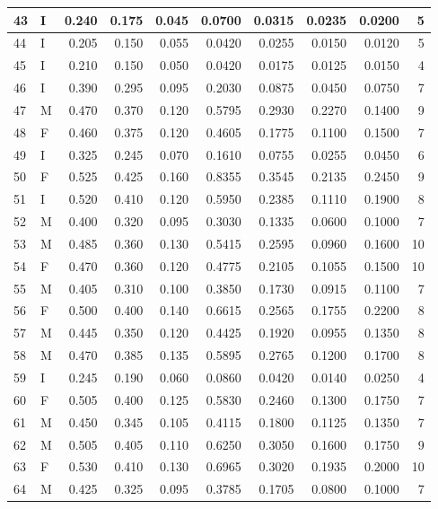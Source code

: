 \documentclass[9pt,twocolumn,twoside,]{pnas-new}
\begin{document}
\begin{tabular}{l|l|r|r|r|r|r|r|r|r}
\hline
43 & I & 0.240 & 0.175 & 0.045 & 0.0700 & 0.0315 & 0.0235 & 0.0200 & 5\\
\hline
44 & I & 0.205 & 0.150 & 0.055 & 0.0420 & 0.0255 & 0.0150 & 0.0120 & 5\\
\hline
45 & I & 0.210 & 0.150 & 0.050 & 0.0420 & 0.0175 & 0.0125 & 0.0150 & 4\\
\hline
46 & I & 0.390 & 0.295 & 0.095 & 0.2030 & 0.0875 & 0.0450 & 0.0750 & 7\\
\hline
47 & M & 0.470 & 0.370 & 0.120 & 0.5795 & 0.2930 & 0.2270 & 0.1400 & 9\\
\hline
48 & F & 0.460 & 0.375 & 0.120 & 0.4605 & 0.1775 & 0.1100 & 0.1500 & 7\\
\hline
49 & I & 0.325 & 0.245 & 0.070 & 0.1610 & 0.0755 & 0.0255 & 0.0450 & 6\\
\hline
50 & F & 0.525 & 0.425 & 0.160 & 0.8355 & 0.3545 & 0.2135 & 0.2450 & 9\\
\hline
51 & I & 0.520 & 0.410 & 0.120 & 0.5950 & 0.2385 & 0.1110 & 0.1900 & 8\\
\hline
52 & M & 0.400 & 0.320 & 0.095 & 0.3030 & 0.1335 & 0.0600 & 0.1000 & 7\\
\hline
53 & M & 0.485 & 0.360 & 0.130 & 0.5415 & 0.2595 & 0.0960 & 0.1600 & 10\\
\hline
54 & F & 0.470 & 0.360 & 0.120 & 0.4775 & 0.2105 & 0.1055 & 0.1500 & 10\\
\hline
55 & M & 0.405 & 0.310 & 0.100 & 0.3850 & 0.1730 & 0.0915 & 0.1100 & 7\\
\hline
56 & F & 0.500 & 0.400 & 0.140 & 0.6615 & 0.2565 & 0.1755 & 0.2200 & 8\\
\hline
57 & M & 0.445 & 0.350 & 0.120 & 0.4425 & 0.1920 & 0.0955 & 0.1350 & 8\\
\hline
58 & M & 0.470 & 0.385 & 0.135 & 0.5895 & 0.2765 & 0.1200 & 0.1700 & 8\\
\hline
59 & I & 0.245 & 0.190 & 0.060 & 0.0860 & 0.0420 & 0.0140 & 0.0250 & 4\\
\hline
60 & F & 0.505 & 0.400 & 0.125 & 0.5830 & 0.2460 & 0.1300 & 0.1750 & 7\\
\hline
61 & M & 0.450 & 0.345 & 0.105 & 0.4115 & 0.1800 & 0.1125 & 0.1350 & 7\\
\hline
62 & M & 0.505 & 0.405 & 0.110 & 0.6250 & 0.3050 & 0.1600 & 0.1750 & 9\\
\hline
63 & F & 0.530 & 0.410 & 0.130 & 0.6965 & 0.3020 & 0.1935 & 0.2000 & 10\\
\hline
64 & M & 0.425 & 0.325 & 0.095 & 0.3785 & 0.1705 & 0.0800 & 0.1000 & 7\\

\end{tabular}
\end{document}
